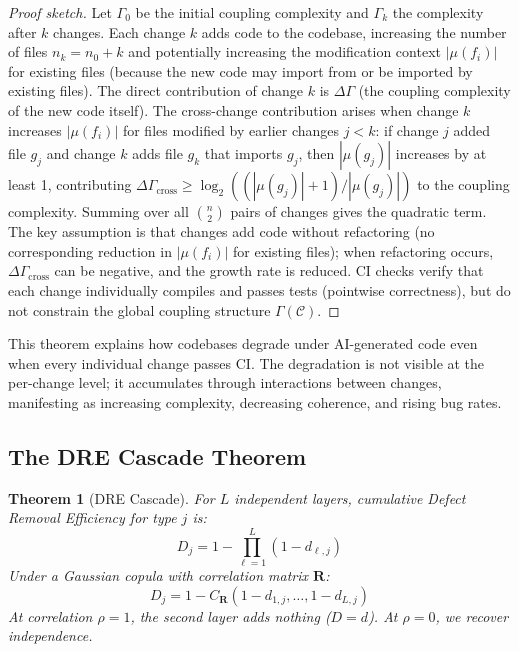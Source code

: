 \documentclass[11pt, a4paper]{googledeepmind}
\newtheorem{theorem}{Theorem}[section]
\begin{document}
\begin{proof}[Proof sketch]
Let $\Gamma_0$ be the initial coupling complexity and $\Gamma_k$ the complexity after $k$ changes. Each change $k$ adds code to the codebase, increasing the number of files $n_k = n_0 + k$ and potentially increasing the modification context $|\mu(f_i)|$ for existing files (because the new code may import from or be imported by existing files). The direct contribution of change $k$ is $\Delta \Gamma$ (the coupling complexity of the new code itself). The cross-change contribution arises when change $k$ increases $|\mu(f_i)|$ for files modified by earlier changes $j < k$: if change $j$ added file $g_j$ and change $k$ adds file $g_k$ that imports $g_j$, then $|\mu(g_j)|$ increases by at least 1, contributing $\Delta \Gamma_{\text{cross}} \geq \log_2((|\mu(g_j)|+1)/|\mu(g_j)|)$ to the coupling complexity. Summing over all $\binom{n}{2}$ pairs of changes gives the quadratic term. The key assumption is that changes add code without refactoring (no corresponding reduction in $|\mu(f_i)|$ for existing files); when refactoring occurs, $\Delta \Gamma_{\text{cross}}$ can be negative, and the growth rate is reduced. CI checks verify that each change individually compiles and passes tests (pointwise correctness), but do not constrain the global coupling structure $\Gamma(\mathcal{C})$.
\end{proof}

This theorem explains how codebases degrade under AI-generated code even when every individual change passes CI. The degradation is not visible at the per-change level; it accumulates through interactions between changes, manifesting as increasing complexity, decreasing coherence, and rising bug rates.

\subsection{The DRE Cascade Theorem}

\begin{theorem}[DRE Cascade]
\label{thm:dre-cascade}
For $L$ independent layers, cumulative Defect Removal Efficiency for type $j$ is:
\begin{equation}
D_j = 1 - \prod_{\ell=1}^{L} (1 - d_{\ell,j})
\end{equation}
Under a Gaussian copula with correlation matrix $\mathbf{R}$:
\begin{equation}
D_j = 1 - C_{\mathbf{R}}(1 - d_{1,j}, \ldots, 1 - d_{L,j})
\end{equation}
At correlation $\rho = 1$, the second layer adds nothing ($D = d$). At $\rho = 0$, we recover independence.
\end{theorem}
\end{document}
